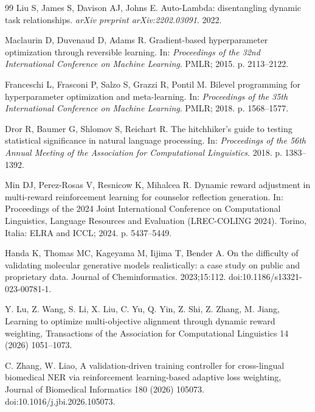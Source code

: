 \documentclass[referee,lineno,pdflatex,sn-basic]{sn-jnl}
\theoremstyle{thmstyleone}%
\theoremstyle{thmstyletwo}%
\theoremstyle{thmstylethree}%
\begin{document}
\begin{thebibliography}{99}
Liu S, James S, Davison AJ, Johns E.
Auto-Lambda: disentangling dynamic task relationships.
\textit{arXiv preprint arXiv:2202.03091}. 2022.

Maclaurin D, Duvenaud D, Adams R.
Gradient-based hyperparameter optimization through reversible learning.
In: \textit{Proceedings of the 32nd International Conference on Machine Learning}. PMLR; 2015. p. 2113--2122.

Franceschi L, Frasconi P, Salzo S, Grazzi R, Pontil M.
Bilevel programming for hyperparameter optimization and meta-learning.
In: \textit{Proceedings of the 35th International Conference on Machine Learning}. PMLR; 2018. p. 1568--1577.

Dror R, Baumer G, Shlomov S, Reichart R.
The hitchhiker's guide to testing statistical significance in natural language processing.
In: \textit{Proceedings of the 56th Annual Meeting of the Association for Computational Linguistics}. 2018. p. 1383--1392.

Min DJ, Perez-Rosas V, Resnicow K, Mihalcea R.
Dynamic reward adjustment in multi-reward reinforcement learning for counselor
reflection generation.
In: Proceedings of the 2024 Joint International Conference on Computational
Linguistics, Language Resources and Evaluation (LREC-COLING 2024).
Torino, Italia: ELRA and ICCL; 2024. p. 5437--5449.

Handa K, Thomas MC, Kageyama M, Iijima T, Bender A.
On the difficulty of validating molecular generative models realistically:
a case study on public and proprietary data.
Journal of Cheminformatics. 2023;15:112.
doi:10.1186/s13321-023-00781-1.

Y. Lu, Z. Wang, S. Li, X. Liu, C. Yu, Q. Yin, Z. Shi, Z. Zhang, M. Jiang,
Learning to optimize multi-objective alignment through dynamic reward weighting,
Transactions of the Association for Computational Linguistics 14 (2026) 1051--1073.

C. Zhang, W. Liao,
A validation-driven training controller for cross-lingual biomedical NER via reinforcement learning-based adaptive loss weighting,
Journal of Biomedical Informatics 180 (2026) 105073.
doi:10.1016/j.jbi.2026.105073.

\end{thebibliography}
\end{document}
